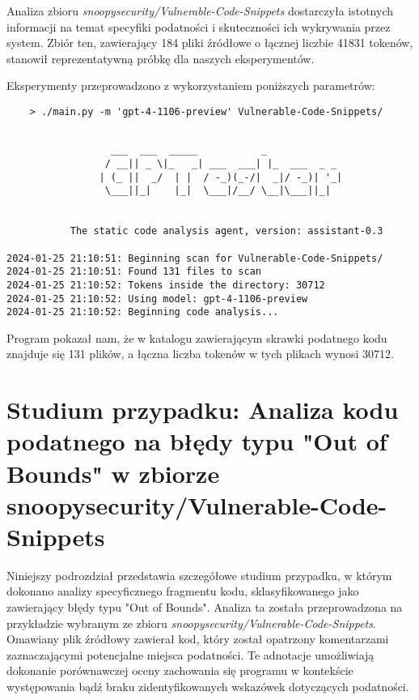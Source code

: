 Analiza zbioru \textit{snoopysecurity/Vulnerable-Code-Snippets} dostarczyła istotnych informacji na temat specyfiki podatności i skuteczności ich wykrywania przez system. Zbiór ten, zawierający 184 pliki źródłowe o łącznej liczbie 41831 tokenów, stanowił reprezentatywną próbkę dla naszych eksperymentów.

Eksperymenty przeprowadzono z wykorzystaniem poniższych parametrów:
\begin{verbatim}
    > ./main.py -m 'gpt-4-1106-preview' Vulnerable-Code-Snippets/
\end{verbatim}


\begin{verbatim}

                  ___  ___  _____           _             
                 / __|| _ \|_   _| ___  ___| |_  ___  _ _ 
                | (_ ||  _/  | |  / -_)(_-/|  _|/ -_)| '_|
                 \___||_|    |_|  \___|/__/ \__|\___||_|  


           The static code analysis agent, version: assistant-0.3

2024-01-25 21:10:51: Beginning scan for Vulnerable-Code-Snippets/
2024-01-25 21:10:51: Found 131 files to scan
2024-01-25 21:10:52: Tokens inside the directory: 30712
2024-01-25 21:10:52: Using model: gpt-4-1106-preview
2024-01-25 21:10:52: Beginning code analysis...

\end{verbatim}

Program pokazał nam, że w katalogu zawierającym skrawki podatnego kodu znajduje się 131 plików, a łączna liczba tokenów w tych plikach wynosi 30712.
\newpage
\section{Studium przypadku: Analiza kodu podatnego na błędy typu "Out of Bounds" w zbiorze snoopysecurity/Vulnerable-Code-Snippets}
\label{sec:analiza_blednego_kodu}

Niniejszy podrozdział przedstawia szczegółowe studium przypadku, w którym dokonano analizy specyficznego fragmentu kodu, sklasyfikowanego jako zawierający błędy typu "Out of Bounds". Analiza ta została przeprowadzona na przykładzie wybranym ze zbioru \textit{snoopysecurity/Vulnerable-Code-Snippets}. Omawiany plik źródłowy zawierał kod, który został opatrzony komentarzami zaznaczającymi potencjalne miejsca podatności. Te adnotacje umożliwiają dokonanie porównawczej oceny zachowania się programu w kontekście występowania bądź braku zidentyfikowanych wskazówek dotyczących podatności.

